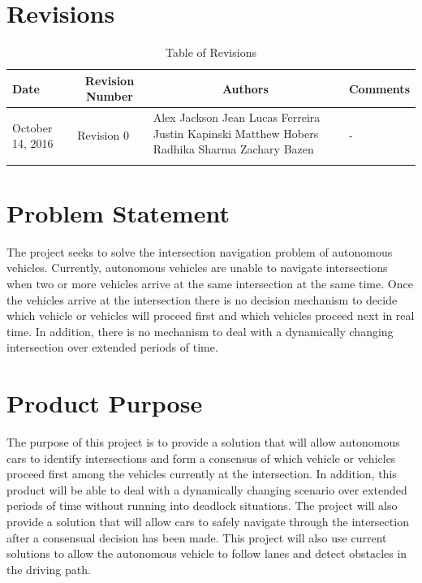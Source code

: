 \documentclass [12pt]{article}
\begin{document}

\tableofcontents
\listoftables

\pagebreak


\section{Revisions}
\begin{longtable}{| p{ } | p{ } | p{ } | p{ } |}

\hline 
\centering \textbf{Date} & 
\multicolumn{1}{c}{\textbf {Revision Number}} &
\multicolumn{1}{|c}{\textbf {Authors}} & 
\multicolumn{1}{|c|}{\textbf {Comments}} \\ \hline

\multirow{4}{*}{\centering October 14, 2016}  & 
\multirow{4}{*}{Revision 0}& 
{Alex Jackson \newline
		Jean Lucas Ferreira \newline
		Justin Kapinski\newline
		Matthew Hobers\newline
		Radhika Sharma\newline
		Zachary Bazen}
 &
\multirow{4}{*}{-} \\ 
\hline 

\caption{Table of Revisions} 
\end{longtable}

\pagebreak

\section{Problem Statement}
The project seeks to solve the intersection navigation problem of autonomous vehicles. Currently, autonomous vehicles are unable to navigate intersections when two or more vehicles arrive at the same intersection at the same time. Once the vehicles arrive at the intersection there is no decision mechanism to decide which vehicle or vehicles will proceed first and which vehicles proceed next in real time. In addition, there is no mechanism to deal with a dynamically changing intersection over extended periods of time.

\section{Product Purpose}
The purpose of this  project is to provide a solution that will allow autonomous cars to identify intersections and form a consensus of which vehicle or vehicles proceed first among the vehicles currently at the  intersection. In addition, this product will be able to deal with a dynamically changing scenario over extended periods of time without running into deadlock situations. The project will also provide a solution that will allow cars to safely navigate through the intersection after a consensual decision has been made. This project will also use current solutions to allow the autonomous vehicle to follow lanes and detect obstacles in the driving path. 
\end{document}
